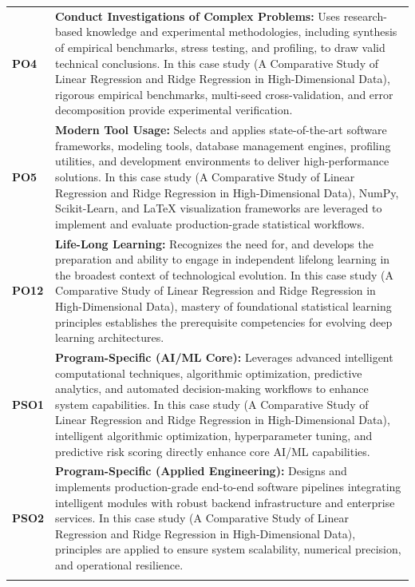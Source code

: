 {\begin{longtable}{@{}>{\centering\arraybackslash}p{1.8cm} p{13.2cm}@{}}
    \addlinespace
\textbf{PO4} & \textbf{Conduct Investigations of Complex Problems:} Uses research-based knowledge and experimental methodologies, including synthesis of empirical benchmarks, stress testing, and profiling, to draw valid technical conclusions. In this case study (A Comparative Study of Linear Regression and Ridge Regression in High-Dimensional Data), rigorous empirical benchmarks, multi-seed cross-validation, and error decomposition provide experimental verification. \\
    \addlinespace
\textbf{PO5} & \textbf{Modern Tool Usage:} Selects and applies state-of-the-art software frameworks, modeling tools, database management engines, profiling utilities, and development environments to deliver high-performance solutions. In this case study (A Comparative Study of Linear Regression and Ridge Regression in High-Dimensional Data), NumPy, Scikit-Learn, and LaTeX visualization frameworks are leveraged to implement and evaluate production-grade statistical workflows. \\
    \addlinespace
\textbf{PO12} & \textbf{Life-Long Learning:} Recognizes the need for, and develops the preparation and ability to engage in independent lifelong learning in the broadest context of technological evolution. In this case study (A Comparative Study of Linear Regression and Ridge Regression in High-Dimensional Data), mastery of foundational statistical learning principles establishes the prerequisite competencies for evolving deep learning architectures. \\
    \addlinespace
\textbf{PSO1} & \textbf{Program-Specific (AI/ML Core):} Leverages advanced intelligent computational techniques, algorithmic optimization, predictive analytics, and automated decision-making workflows to enhance system capabilities. In this case study (A Comparative Study of Linear Regression and Ridge Regression in High-Dimensional Data), intelligent algorithmic optimization, hyperparameter tuning, and predictive risk scoring directly enhance core AI/ML capabilities. \\
    \addlinespace
\textbf{PSO2} & \textbf{Program-Specific (Applied Engineering):} Designs and implements production-grade end-to-end software pipelines integrating intelligent modules with robust backend infrastructure and enterprise services. In this case study (A Comparative Study of Linear Regression and Ridge Regression in High-Dimensional Data), principles are applied to ensure system scalability, numerical precision, and operational resilience. \\
    \addlinespace
    \bottomrule
\end{longtable}}
